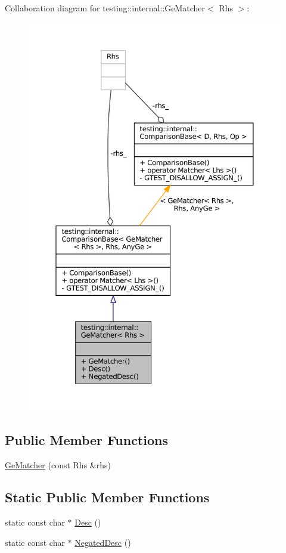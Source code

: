 Collaboration diagram for testing\+:\+:internal\+:\+:Ge\+Matcher$<$ Rhs $>$\+:
\nopagebreak
\begin{figure}[H]
\begin{center}
\leavevmode
\includegraphics[width=350pt]{classtesting_1_1internal_1_1GeMatcher__coll__graph}
\end{center}
\end{figure}
\subsection*{Public Member Functions}
\begin{DoxyCompactItemize}
\item 
\hyperlink{classtesting_1_1internal_1_1GeMatcher_aba23cbb4040d08be1a9db09b73906182}{Ge\+Matcher} (const Rhs \&rhs)
\end{DoxyCompactItemize}
\subsection*{Static Public Member Functions}
\begin{DoxyCompactItemize}
\item 
static const char $\ast$ \hyperlink{classtesting_1_1internal_1_1GeMatcher_a5676836bfa354f4398dd083621a05877}{Desc} ()
\item 
static const char $\ast$ \hyperlink{classtesting_1_1internal_1_1GeMatcher_a028847a76dbf02b8da3d56ce448ef053}{Negated\+Desc} ()
\end{DoxyCompactItemize}


